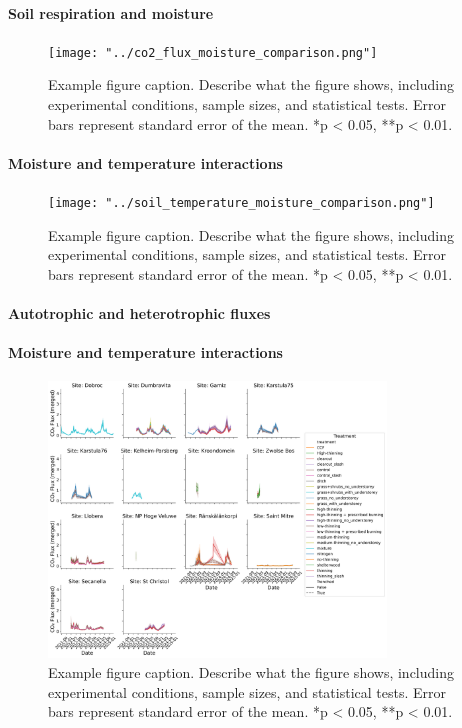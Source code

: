 \documentclass[12pt,a4paper]{article}
\begin{document}
\paragraph{Soil respiration and moisture}
\begin{figure}[H]
    \centering
    \texttt{[image: "../co2\_flux\_moisture\_comparison.png"]}
    \caption{Example figure caption. Describe what the figure shows, including experimental conditions, sample sizes, and statistical tests. Error bars represent standard error of the mean. *p < 0.05, **p < 0.01.}
    \label{fig:example}
\end{figure}

\paragraph{Moisture and temperature interactions}
\begin{figure}[H]
    \centering
    \texttt{[image: "../soil\_temperature\_moisture\_comparison.png"]}
    \caption{Example figure caption. Describe what the figure shows, including experimental conditions, sample sizes, and statistical tests. Error bars represent standard error of the mean. *p < 0.05, **p < 0.01.}
    \label{fig:example}
\end{figure}


\paragraph{Autotrophic and heterotrophic fluxes}

\paragraph{Moisture and temperature interactions}
\begin{figure}[H]
    \centering
    \includegraphics[width=0.8\textwidth]{"../co2_flux_timeseries.png"}
    \caption{Example figure caption. Describe what the figure shows, including experimental conditions, sample sizes, and statistical tests. Error bars represent standard error of the mean. *p < 0.05, **p < 0.01.}
    \label{fig:example}
\end{figure}
\end{document}
